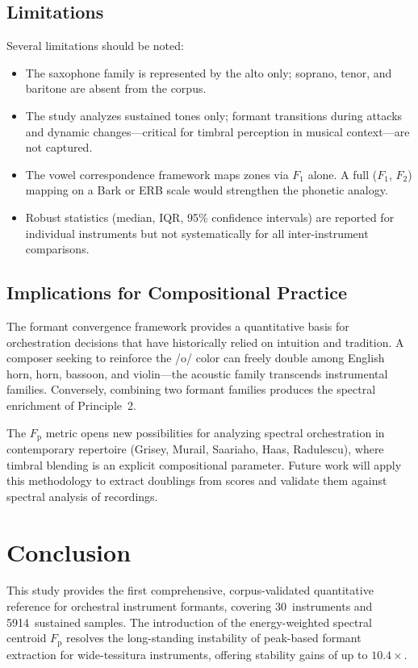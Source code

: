 \documentclass[journal]{IEEEtran}
\newcommand{\Fp}{F_\mathrm{p}}
\newcommand{\Fn}[1]{F_{#1}}
\begin{document}
\subsection{Limitations}
Several limitations should be noted:
\begin{itemize}
\item The saxophone family is represented by the alto only; soprano, tenor, and baritone are absent from the corpus.
\item The study analyzes sustained tones only; formant transitions during attacks and dynamic changes---critical for timbral perception in musical context---are not captured.
\item The vowel correspondence framework maps zones via $\Fn{1}$ alone. A full ($\Fn{1}$, $\Fn{2}$) mapping on a Bark or ERB scale would strengthen the phonetic analogy.
\item Robust statistics (median, IQR, 95\% confidence intervals) are reported for individual instruments but not systematically for all inter-instrument comparisons.
\end{itemize}

\subsection{Implications for Compositional Practice}
The formant convergence framework provides a quantitative basis for orchestration decisions that have historically relied on intuition and tradition. A composer seeking to reinforce the /o/ color can freely double among English horn, horn, bassoon, and violin---the acoustic family transcends instrumental families. Conversely, combining two formant families produces the spectral enrichment of Principle~2.

The $\Fp$ metric opens new possibilities for analyzing spectral orchestration in contemporary repertoire (Grisey, Murail, Saariaho, Haas, Radulescu), where timbral blending is an explicit compositional parameter. Future work will apply this methodology to extract doublings from scores and validate them against spectral analysis of recordings.

\section{Conclusion}
\label{sec:conclusion}

This study provides the first comprehensive, corpus-validated quantitative reference for orchestral instrument formants, covering 30~instruments and \num{5914}~sustained samples. The introduction of the energy-weighted spectral centroid $\Fp$ resolves the long-standing instability of peak-based formant extraction for wide-tessitura instruments, offering stability gains of up to $10.4\times$.
\end{document}
